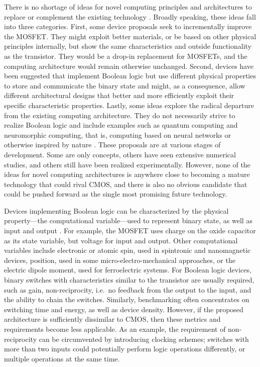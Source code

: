 There is no shortage of ideas for novel computing principles and architectures
to replace or complement the existing technology \cite{cavin2012science}
\cite{bernstein2010device}. Broadly speaking, these ideas fall into three
categories. First, some device proposals seek to incrementally improve the
MOSFET. They might exploit better materials, or be based on other physical
principles internally, but show the same characteristics and outside
functionality as the transistor. They would be a drop-in replacement for
MOSFETs, and the computing architecture would remain otherwise unchanged.
Second, devices have been suggested that implement Boolean logic but use
different physical properties to store and communicate the binary state and
might, as a consequence, allow different architectural designs that better and
more efficiently exploit their specific characteristic properties. Lastly, some
ideas explore the radical departure from the existing computing architecture.
They do not necessarily strive to realize Boolean logic and include examples
such as quantum computing and neuromorphic computing, that is, computing based
on neural networks or otherwise inspired by nature \cite{mead1990neuromorphic}
\cite{schemmel2010wafer} \cite{furber2012overview}. These proposals are at
various stages of development. Some are only concepts, others have seen
extensive numerical studies, and others still have been realized experimentally.
However, none of the ideas for novel computing architectures is anywhere close
to becoming a mature technology that could rival CMOS, and there is also no
obvious candidate that could be pushed forward as the single most promising
future technology.

Devices implementing Boolean logic can be characterized by the physical
property---the computational variable---used to represent binary state, as well
as input and output \cite{nikonov2013overview}. For example, the MOSFET uses
charge on the oxide capacitor as its state variable, but voltage for input and
output. Other computational variables include electronic or atomic spin, used in
spintronic and nanomagnetic devices, position, used in some
micro-electro-mechanical approaches, or the electric dipole moment, used for
ferroelectric systems. For Boolean logic devices, binary switches with
characteristics similar to the transistor are usually required, such as gain,
non-reciprocity, i.e.~no feedback from the output to the input, and the ability
to chain the switches. Similarly, benchmarking often concentrates on switching
time and energy, as well as device density. However, if the proposed
architecture is sufficiently dissimilar to CMOS, then these metrics and
requirements become less applicable. As an example, the requirement of
non-reciprocity can be circumvented by introducing clocking schemes; switches
with more than two inputs could potentially perform logic operations
differently, or multiple operations at the same time.

